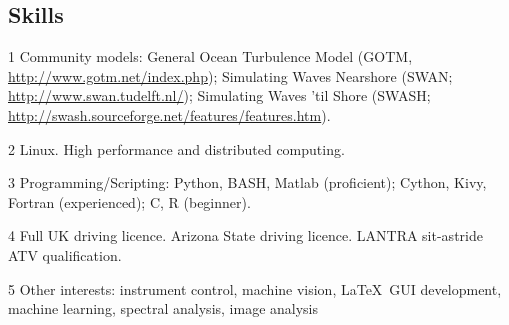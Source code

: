 \documentclass[margin,line]{resume}
\begin{document}
\begin{resume}
    \section{\mysidestyle Skills} 
    \begin{footnotesize}
    \begin{list1}
        \item[1] Community models: General Ocean Turbulence Model (GOTM, \url{http://www.gotm.net/index.php}); Simulating Waves Nearshore (SWAN; \url{http://www.swan.tudelft.nl/}); Simulating Waves 'til Shore (SWASH; \url{http://swash.sourceforge.net/features/features.htm}).\\
        \item[2] Linux. High performance and distributed computing.\\
        \item[3] Programming/Scripting: Python, BASH, Matlab (proficient); Cython, Kivy, Fortran (experienced); C, R (beginner).\\
        \item[4] Full UK driving licence. Arizona State driving licence. LANTRA sit-astride ATV qualification.\\
        \item[5] Other interests: instrument control, machine vision, \LaTeX\, GUI development, machine learning, spectral analysis, image analysis
    \end{list1}
     \end{footnotesize}


\end{resume}
\end{document}
